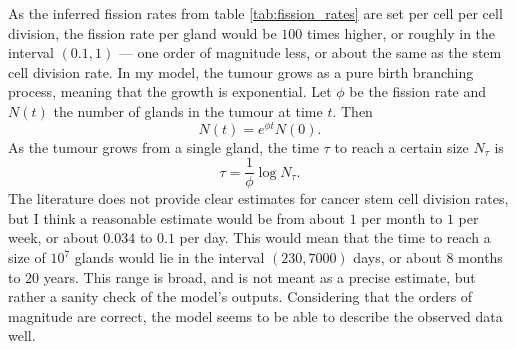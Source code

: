 As the inferred fission rates from table \ref{tab:fission_rates} are set per
cell per cell division, the fission rate per gland would be $100$ times higher,
or roughly in the interval $(0.1, 1)$ --- one order of magnitude less, or about
the same as the stem cell division rate. In my model, the tumour grows as a pure
birth branching process, meaning that the growth is exponential. Let $\phi$ be
the fission rate and $N(t)$ the number of glands in the tumour at time $t$. Then
\begin{equation}
    N(t) = e^{\phi t}N(0).
\end{equation}
As the tumour grows from a single gland, the time $\tau$ to reach a certain
size $N_\tau$ is
\begin{equation}
    \tau = \frac{1}{\phi}\log N_\tau.
\end{equation}
The literature does not provide clear estimates for cancer stem cell division
rates, but I think a reasonable estimate would be from about $1$ per month to
$1$ per week, or about $0.034$ to $0.1$ per day. This would mean that the time
to reach a size of $10^7$ glands would lie in the interval $(230, 7000)$ days,
or about $8$ months to $20$ years. This range is broad, and is not meant as a
precise estimate, but rather a sanity check of the model's outputs. Considering
that the orders of magnitude are correct, the model seems to be able to describe
the observed data well.

